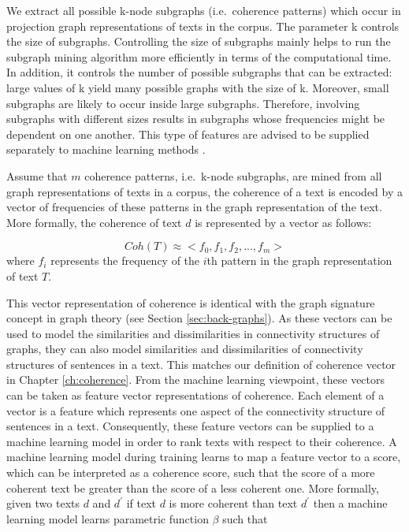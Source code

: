 We extract all possible k-node subgraphs (i.e.\ coherence patterns) which occur in projection graph representations of texts in the corpus. 
The parameter k controls the size of subgraphs.  
Controlling the size of subgraphs mainly helps to run the subgraph mining algorithm more efficiently in terms of the computational time.
In addition, it controls the number of possible subgraphs that can be extracted: large values of k yield many possible graphs with the size of k. 
Moreover, small subgraphs are likely to occur inside large subgraphs. 
Therefore, involving subgraphs with different sizes results in subgraphs whose frequencies might be dependent on one another. 
This type of features are advised to be supplied separately to machine learning methods \cite{aggarwalcharu18}. 

Assume that $m$ coherence patterns, i.e.\ k-node subgraphs, are mined from all graph representations of texts in a corpus, the coherence of a text is encoded by a vector of frequencies of these patterns in the graph representation of the text. 
More formally, the coherence of  text $d$ is represented by a vector as follows:

\begin{equation}
Coh(T) \approx <f_0,f_1,f_2,...,f_m>
\end{equation}
where $f_i$ represents the frequency of the $i${th} pattern in the graph representation of text $T$. 

This vector representation of coherence is identical with the graph signature concept in graph theory (see Section \ref{sec:back-graphs}). 
As these vectors can be used to model the similarities and dissimilarities in connectivity structures of graphs, they can also model similarities and dissimilarities of connectivity structures of sentences in a text. 
This matches our definition of coherence vector in Chapter \ref{ch:coherence}.   
From the machine learning viewpoint, these vectors can be taken as feature vector representations of coherence. 
Each element of a vector is a feature which represents one aspect of the connectivity structure of sentences in a text. 
Consequently, these feature vectors can be supplied to a machine learning model in order to rank texts with respect to their coherence. 
A machine learning model during training learns to map a feature vector to a score, which can be interpreted as a coherence score, such that the score of a more coherent text be greater than the score of a less coherent one. 
More formally, given two texts $d$ and $d^\prime$ if text $d$ is more coherent than text $d^\prime$ then a machine learning model learns parametric function $\beta$ such that 

